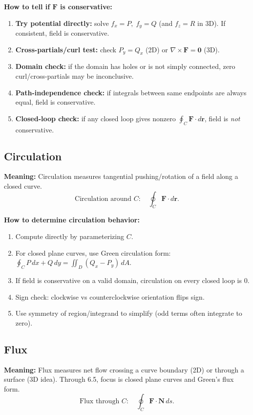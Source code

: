 \documentclass[12pt, twoside]{article}
\begin{document}
\textbf{How to tell if $\mathbf{F}$ is conservative:}
\begin{enumerate}[leftmargin=*]
  \item \textbf{Try potential directly:} solve $f_x=P,\;f_y=Q$ (and $f_z=R$ in 3D). If consistent, field is conservative.
  \item \textbf{Cross-partials/curl test:} check $P_y=Q_x$ (2D) or $\nabla\times\mathbf{F}=\mathbf{0}$ (3D).
  \item \textbf{Domain check:} if the domain has holes or is not simply connected, zero curl/cross-partials may be inconclusive.
  \item \textbf{Path-independence check:} if integrals between same endpoints are always equal, field is conservative.
  \item \textbf{Closed-loop check:} if any closed loop gives nonzero $\oint_C\mathbf{F}\cdot d\mathbf{r}$, field is \emph{not} conservative.
\end{enumerate}

\subsection*{Circulation}
\textbf{Meaning:} Circulation measures tangential pushing/rotation of a field along a closed curve.
\[
\text{Circulation around }C:\quad \oint_C\mathbf{F}\cdot d\mathbf{r}.
\]

\textbf{How to determine circulation behavior:}
\begin{enumerate}[leftmargin=*]
  \item Compute directly by parameterizing $C$.
  \item For closed plane curves, use Green circulation form: $\oint_C P\,dx+Q\,dy=\iint_D(Q_x-P_y)\,dA$.
  \item If field is conservative on a valid domain, circulation on every closed loop is $0$.
  \item Sign check: clockwise vs counterclockwise orientation flips sign.
  \item Use symmetry of region/integrand to simplify (odd terms often integrate to zero).
\end{enumerate}

\subsection*{Flux}
\textbf{Meaning:} Flux measures net flow crossing a curve boundary (2D) or through a surface (3D idea). Through 6.5, focus is closed plane curves and Green's flux form.
\[
\text{Flux through }C:\quad \oint_C\mathbf{F}\cdot\mathbf{N}\,ds.
\]
\end{document}
